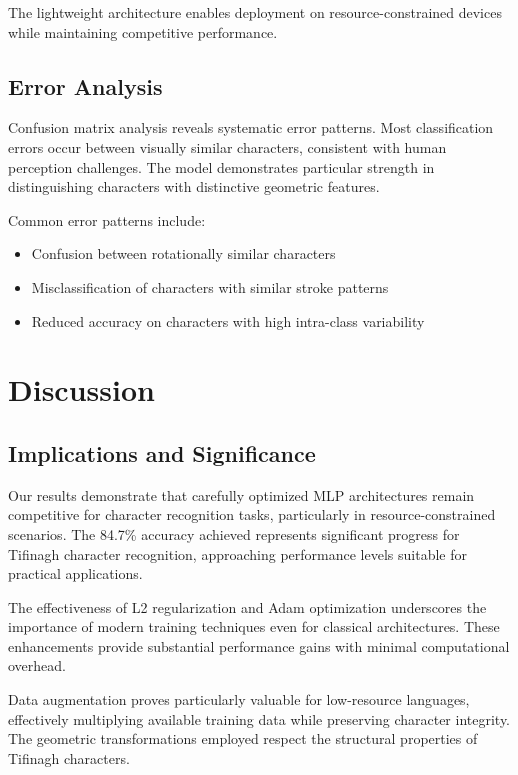 \documentclass[12pt,a4paper]{article}
\begin{document}
	The lightweight architecture enables deployment on resource-constrained devices while maintaining competitive performance.
	
	\subsection{Error Analysis}
	
	Confusion matrix analysis reveals systematic error patterns. Most classification errors occur between visually similar characters, consistent with human perception challenges. The model demonstrates particular strength in distinguishing characters with distinctive geometric features.
	
	Common error patterns include:
	\begin{itemize}
		\item Confusion between rotationally similar characters
		\item Misclassification of characters with similar stroke patterns  
		\item Reduced accuracy on characters with high intra-class variability
	\end{itemize}
	
	\section{Discussion}
	
	\subsection{Implications and Significance}
	
	Our results demonstrate that carefully optimized MLP architectures remain competitive for character recognition tasks, particularly in resource-constrained scenarios. The 84.7\% accuracy achieved represents significant progress for Tifinagh character recognition, approaching performance levels suitable for practical applications.
	
	The effectiveness of L2 regularization and Adam optimization underscores the importance of modern training techniques even for classical architectures. These enhancements provide substantial performance gains with minimal computational overhead.
	
	Data augmentation proves particularly valuable for low-resource languages, effectively multiplying available training data while preserving character integrity. The geometric transformations employed respect the structural properties of Tifinagh characters.
	
\end{document}
